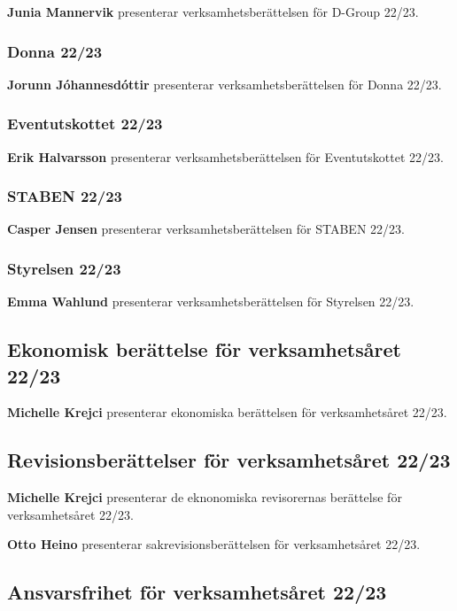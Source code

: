 \documentclass{datateknologsektionen-document}
\begin{document}
\textbf{Junia Mannervik} presenterar verksamhetsberättelsen för D-Group 22/23.

\subsubsection{Donna 22/23}

\textbf{Jorunn Jóhannesdóttir} presenterar verksamhetsberättelsen för Donna 22/23.

\subsubsection{Eventutskottet 22/23}

\textbf{Erik Halvarsson} presenterar verksamhetsberättelsen för Eventutskottet 22/23.

\subsubsection{STABEN 22/23}

\textbf{Casper Jensen} presenterar verksamhetsberättelsen för STABEN 22/23.

\subsubsection{Styrelsen 22/23}

\textbf{Emma Wahlund} presenterar verksamhetsberättelsen för Styrelsen 22/23.

\subsection{Ekonomisk berättelse för verksamhetsåret 22/23}

\textbf{Michelle Krejci} presenterar ekonomiska berättelsen för verksamhetsåret 22/23.

\subsection{Revisionsberättelser för verksamhetsåret 22/23}

\textbf{Michelle Krejci} presenterar de eknonomiska revisorernas berättelse för verksamhetsåret 22/23.

\textbf{Otto Heino} presenterar sakrevisionsberättelsen för verksamhetsåret 22/23.

\subsection{Ansvarsfrihet för verksamhetsåret 22/23}
\end{document}
